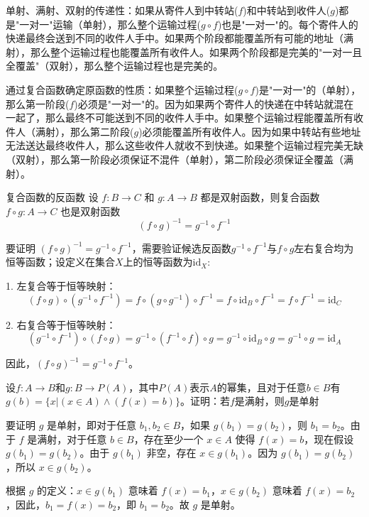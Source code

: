 单射、满射、双射的传递性：如果从寄件人到中转站($f$)和中转站到收件人($g$)都是"一对一"运输（单射），那么整个运输过程($g \circ f$)也是"一对一"的。每个寄件人的快递最终会送到不同的收件人手中。如果两个阶段都能覆盖所有可能的地址（满射），那么整个运输过程也能覆盖所有收件人。如果两个阶段都是完美的"一对一且全覆盖"（双射），那么整个运输过程也是完美的。

通过复合函数确定原函数的性质：如果整个运输过程($g \circ f$)是"一对一"的（单射），那么第一阶段($f$)必须是"一对一"的。因为如果两个寄件人的快递在中转站就混在一起了，那么最终不可能送到不同的收件人手中。如果整个运输过程能覆盖所有收件人（满射），那么第二阶段($g$)必须能覆盖所有收件人。因为如果中转站有些地址无法送达最终收件人，那么这些收件人就收不到快递。如果整个运输过程完美无缺（双射），那么第一阶段必须保证不混件（单射），第二阶段必须保证全覆盖（满射）。
\begin{theorem}{复合函数的反函数}{}
设 $f: B \to C$ 和 $g: A \to B$ 都是双射函数，则复合函数 $f \circ g: A \to C$ 也是双射函数\vspace{-10pt}
\[(f \circ g)^{-1} = g^{-1} \circ f^{-1}\]
\end{theorem}
要证明 $(f \circ g)^{-1} = g^{-1} \circ f^{-1}$，需要验证候选反函数$g^{-1}\circ f^{-1}$与$f\circ g$左右复合均为恒等函数；设定义在集合$X$上的恒等函数为$\text{id}_X$:

1. 左复合等于恒等映射：
\[
(f \circ g) \circ (g^{-1} \circ f^{-1}) = f \circ (g \circ g^{-1}) \circ f^{-1} = f \circ \text{id}_B \circ f^{-1} = f \circ f^{-1} = \text{id}_C
\]

2. 右复合等于恒等映射：
\[
(g^{-1} \circ f^{-1}) \circ (f \circ g) = g^{-1} \circ (f^{-1} \circ f) \circ g = g^{-1} \circ \text{id}_B \circ g = g^{-1} \circ g = \text{id}_A
\]

因此，$(f \circ g)^{-1} = g^{-1} \circ f^{-1}$。
\begin{example}{}{}
    设$f:A\to B$和$g:B\to P(A)$，其中$P(A)$表示$A$的幂集，且对于任意$b\in B$有$g(b)=\{x|(x\in A)\land(f(x)=b)\}$。证明：若$f$是满射，则$g$是单射
\end{example}
要证明 $g$ 是单射，即对于任意 $b_1, b_2 \in B$，如果 $g(b_1) = g(b_2)$，则 $b_1 = b_2$。由于 $f$ 是满射，对于任意 $b \in B$，存在至少一个 $x \in A$ 使得 $f(x) = b$，现在假设 $g(b_1) = g(b_2)$。由于 $g(b_1)$ 非空，存在 $x \in g(b_1)$。因为 $g(b_1) = g(b_2)$，所以 $x \in g(b_2)$。

根据 $g$ 的定义：$x \in g(b_1)$ 意味着 $f(x) = b_1$，$x \in g(b_2)$ 意味着 $f(x) = b_2$，因此，$b_1 = f(x) = b_2$，即 $b_1 = b_2$。故 $g$ 是单射。

